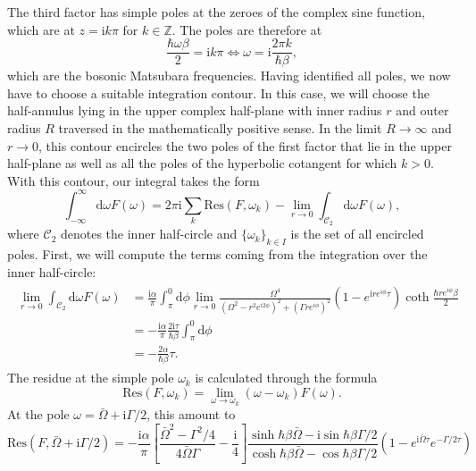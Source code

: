 %
The third factor has simple poles at the zeroes of the complex sine function, which are
at $z=\text{i}k\pi$ for $k\in\mathbb{Z}$. The poles are therefore at
%
\begin{equation}
    \frac{\hbar\omega\beta}{2}=\text{i}k\pi 
    \Leftrightarrow \omega=\text{i}\frac{2\pi k}{\hbar\beta},
\end{equation}
%
which are the bosonic Matsubara frequencies. Having identified all poles, we now have to 
choose a suitable integration contour. In this case, we will choose the half-annulus lying 
in the upper complex half-plane with inner radius $r$ and outer radius $R$ traversed in the
mathematically positive sense. In the limit $R\rightarrow\infty$ and $r\rightarrow0$,
this contour encircles the two poles of the first factor that lie in the upper half-plane
as well as all the poles of the hyperbolic cotangent for which $k>0$.
With this contour, our integral takes the form
%
\begin{equation}
    \int_{-\infty}^{\infty}\text{d}\omega F(\omega)=2\pi\text{i}\sum_{k}\text{Res}(F,\omega_k)
    -\lim_{r\rightarrow 0}\int_{\mathcal{C}_2}\text{d}\omega F(\omega),
\end{equation}
%
where $\mathcal{C}_2$ denotes the inner half-circle and $\{ \omega_k \}_{k\in I}$ is 
the set of all encircled poles. First, we will compute the terms coming from the 
integration over the inner half-circle:
%
\begin{align}
\begin{split}
    \lim_{r\rightarrow 0}\int_{\mathcal{C}_2}\text{d}\omega F(\omega)
    &= \frac{\text{i}\alpha}{\pi}\int_{\pi}^{0}\text{d}\phi\lim_{r\rightarrow 0}
    \frac{\Omega^4}{\left(\Omega^2-r^2e^{i2\phi}\right)^2+\left(\Gamma re^{i\phi}\right)^2}
    \left(1-e^{\text{i}re^{i\phi}\tau}\right)\coth\frac{\hbar re^{i\phi}\beta}{2} \\
    &= -\frac{\text{i}\alpha}{\pi}\frac{2\text{i}\tau}{\hbar\beta}\int_{\pi}^{0}\text{d}\phi \\
    &= -\frac{2\alpha}{\hbar\beta}\tau.
\end{split}
\end{align}
%
The residue at the simple pole $\omega_k$ is calculated through the formula
%
\begin{equation}
    \text{Res}(F,\omega_k)=\lim_{\omega\rightarrow\omega_k}(\omega-\omega_k)F(\omega).
\end{equation}
%
At the pole $\omega=\bar{\Omega}+\text{i}\Gamma/2$, this amount to 
%
\begin{equation}
    \text{Res}(F,\bar{\Omega}+\text{i}\Gamma/2)=-\frac{\text{i}\alpha}{\pi}
    \left[ \frac{\bar{\Omega}^2-\Gamma^2/4}{4\bar{\Omega}\Gamma}-\frac{\text{i}}{4} \right]
    \frac{\sinh\hbar\beta\bar{\Omega}-\text{i}\sin\hbar\beta\Gamma/2}{\cosh\hbar\beta\bar{\Omega}-\cos\hbar\beta\Gamma/2}
    (1-e^{\text{i}\bar{\Omega}\tau}e^{-\Gamma/2\tau})
\end{equation}
